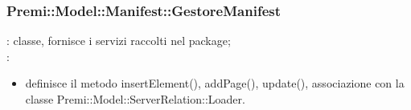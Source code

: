 {{{				\subsubsection{Premi::Model::Manifest::GestoreManifest}{
					\textbf{\tipo}: classe, fornisce i servizi raccolti nel package;\\
					\textbf{\relaz}:
					\begin{itemize}
						\item definisce il metodo insertElement(), addPage(), update(), associazione con la classe Premi::Model::ServerRelation::Loader.
					\end{itemize}
			        }
			}
	}
}
	